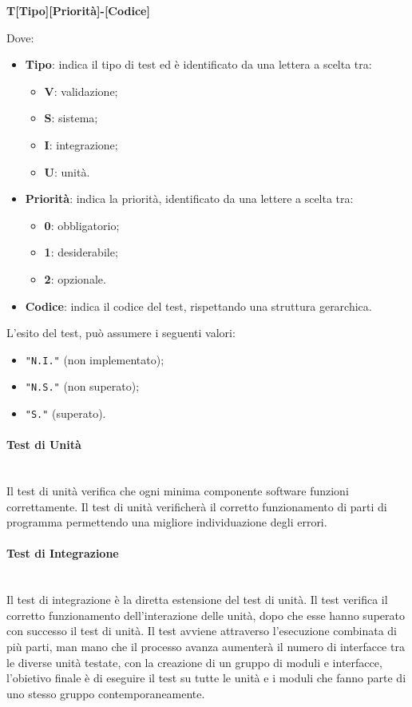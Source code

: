 \begin{center}
	\textbf{T[Tipo][Priorità]-[Codice]}
\end{center}
Dove:
\begin{itemize}
	\item \textbf{Tipo}: indica il tipo di test ed è identificato da una lettera a scelta tra:

	\begin{itemize}
		\item \textbf{V}: validazione;
		\item \textbf{S}: sistema;
		\item \textbf{I}: integrazione;
		\item \textbf{U}: unità.
	\end{itemize}

	\item \textbf{Priorità}: indica la priorità, identificato da una lettere a scelta tra:
	\begin{itemize}
		\item \textbf{0}: obbligatorio;
		\item \textbf{1}: desiderabile;
		\item \textbf{2}: opzionale.
	\end{itemize}
	\item \textbf{Codice}: indica il codice del test, rispettando una struttura gerarchica.
\end{itemize}

L'esito del test, può assumere i seguenti valori:
\begin{itemize}
	\item \texttt{"N.I."} (non implementato);
	\item \texttt{"N.S."} (non superato);
	\item \texttt{"S."} (superato).
\end{itemize}

\paragraph{Test di Unità} \-\\
Il test di unità verifica che ogni minima componente software funzioni correttamente. Il test di unità verificherà il corretto funzionamento di parti di programma permettendo una migliore individuazione degli errori.

\paragraph{Test di Integrazione}\-\\
Il test di integrazione è la diretta estensione del test di unità. Il test verifica il corretto funzionamento dell'interazione delle unità, dopo che esse hanno superato con successo il test di unità. Il test avviene attraverso l'esecuzione combinata di più parti, man mano che il processo avanza aumenterà il numero di interfacce tra le diverse unità testate, con la creazione di un gruppo di moduli e interfacce, l'obietivo finale è di eseguire il test su tutte le unità e i moduli che fanno parte di uno stesso gruppo contemporaneamente.


